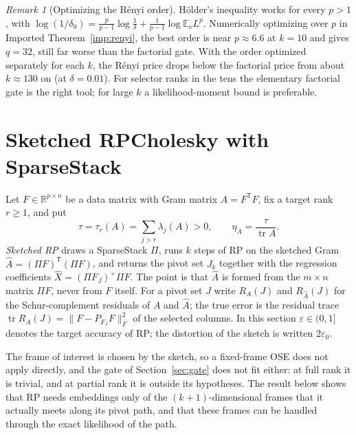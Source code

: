 \documentclass[11pt,a4paper]{article}
\theoremstyle{definition}
\theoremstyle{remark}
\newtheorem{remark}[theorem]{Remark}
\newcommand{\E}{\mathbb E}
\newcommand{\R}{\mathbb R}
\newcommand{\tr}{\operatorname{tr}}
\newcommand{\eps}{\varepsilon}
\newcommand{\norm}[1]{\lVert#1\rVert}
\newcommand{\1}{\mathbf 1}
\newcommand{\T}{\mathsf T}
\begin{document}
\begin{remark}[Optimizing the R\'enyi order]\label{rem:renyi-order}
H\"older's inequality works for every $p>1$, with
$\log(1/\delta_0)=\frac p{p-1}\log\frac1\delta+\frac1{p-1}\log\E_\nu L^p$.
Numerically optimizing over $p$ in Imported Theorem~\ref{imp:renyi}, the
best order is near $p\approx6.6$ at $k=10$ and gives $q=32$, still far
worse than the factorial gate. With the order optimized separately for
each $k$, the R\'enyi price drops below the factorial price from about
$k\approx130$ on (at $\delta=0.01$). For selector ranks in the tens the
elementary factorial gate is the right tool; for large $k$ a
likelihood-moment bound is preferable.
\end{remark}

\section{Sketched RPCholesky with SparseStack}\label{sec:sketchedrp}

Let $F\in\R^{p\times n}$ be a data matrix with Gram matrix $A=F^\T F$,
fix a target rank $r\ge1$, and put
\[
 \tau=\tau_r(A)=\sum_{j>r}\lambda_j(A)>0,\qquad \eta_A=\frac\tau{\tr A}.
\]
\emph{Sketched RP} draws a SparseStack $\Pi$, runs $k$ steps of RP on the
sketched Gram $\widehat A=(\Pi F)^\T(\Pi F)$, and returns the pivot set $J_k$
together with the regression coefficients $\widehat X=(\Pi F_J)^+\Pi F$. The
point is that $\widehat A$ is formed from the $m\times n$ matrix $\Pi F$, never
from $F$ itself. For a pivot set $J$ write $R_A(J)$ and $R_{\widehat A}(J)$
for the Schur-complement residuals of $A$ and $\widehat A$; the true error
is the residual trace $\tr R_A(J)=\norm{F-P_{F_J}F}_F^2$ of the selected
columns. In this section $\eps\in(0,1]$ denotes the target accuracy of RP;
the distortion of the sketch is written $2\eps_0$.

The frame of interest is chosen by the sketch, so a fixed-frame OSE does
not apply directly, and the gate of Section~\ref{sec:gate} does not fit
either: at full rank it is trivial, and at partial rank it is outside
its hypotheses. The result below shows that RP needs embeddings only of
the $(k+1)$-dimensional frames that it actually meets along its pivot
path, and that these frames can be handled through the exact
likelihood of the path.
\end{document}
